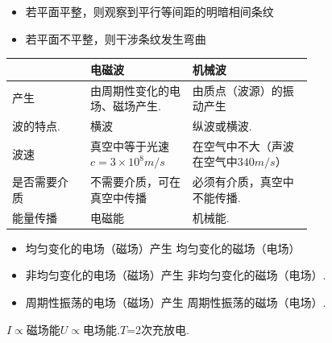\begin{itemize}
\item 若平面平整，则观察到平行等间距的明暗相间条纹 %
\item 若平面不平整，则干涉条纹发生弯曲
\end{itemize}
\begin{center}
\begin{tabular}{@{}lp{0.34\linewidth}p{0.4\linewidth}@{}}
\toprule
 & 电磁波 & 机械波 \\
\midrule
产生 & 由周期性变化的电场、磁场产生. & 由质点（波源）的振动产生 \\
波的特点. & 横波 & 纵波或横波. \\
波速 & 真空中等于光速$c=3\times10^{8}\unit{m/s}$ & 在空气中不大（声波在空气中$340\unit{m/s}$） \\
是否需要介质 & 不需要介质，可在真空中传播 & 必须有介质，真空中不能传播. \\
能量传播 & 电磁能 & 机械能. \\
\bottomrule
\end{tabular}
\end{center}
\begin{itemize}
\item 均匀变化的电场（磁场）产生 均匀变化的磁场（电场） %
\item 非均匀变化的电场（磁场）产生 非均匀变化的磁场（电场）.
\item 周期性振荡的电场（磁场）产生 周期性振荡的磁场（电场）.
\end{itemize}
$I\propto$磁场能\qquad $U\propto$电场能.\qquad $T$=2次充放电.


